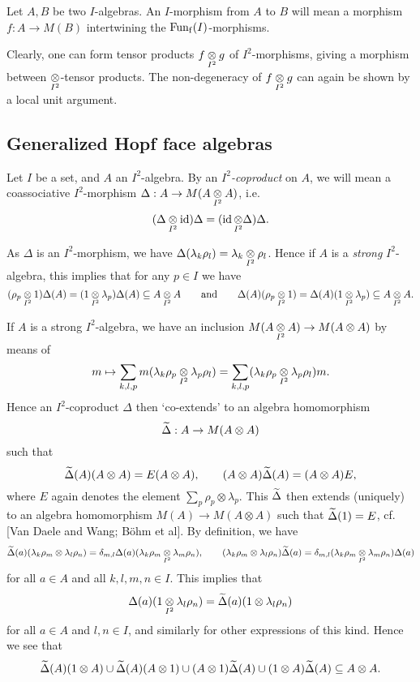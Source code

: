 \begin{Def} Let $A,B$ be two $I$-algebras. An $I$-morphism from $A$ to $B$ will mean a morphism $f:A\rightarrow M(B)$ intertwining the $\mathrm{Fun}_{\operatorname{\mathrm{f}}}(I)$-morphisms.
\end{Def}

Clearly, one can form tensor products $f\underset{I^2}{\otimes} g$ of $I^2$-morphisms,
giving a morphism between $\underset{I^2}{\otimes}$-tensor products. The
non-degeneracy of $f\underset{I^2}{\otimes} g$ can again be shown by a local unit
argument.

\subsection{Generalized Hopf face algebras}

\begin{Def} Let $I$ be a set, and $A$ an $I^2$-algebra. By an
  \emph{$I^2$-coproduct} on $A$, we will mean a coassociative
  $I^2$-morphism $\Delta:A\rightarrow M(A\underset{I^2}{\otimes} A)$,
  i.e. \[(\Delta\underset{I^2}{\otimes} \operatorname{id})\Delta = (\operatorname{id}\underset{I^2}{\otimes} \Delta)\Delta.\]
\end{Def}

\begin{Rem}\label{RemMult} As $\Delta$ is an $I^2$-morphism, we have
  $\Delta(\lambda_k\rho_l) =\lambda_k\underset{I^2}{\otimes} \rho_l$. Hence if $A$ is
  a \emph{strong} $I^2$-algebra, this implies that for any $p\in I$ we
  have \[(\rho_p\underset{I^2}{\otimes} 1)\Delta(A) = (1\underset{I^2}{\otimes} \lambda_p)\Delta(A)
  \subseteq A\underset{I^2}{\otimes} A \qquad \textrm{and}\qquad
  \Delta(A)(\rho_p\underset{I^2}{\otimes} 1)= \Delta(A)(1\underset{I^2}{\otimes} \lambda_p) \subseteq
  A\underset{I^2}{\otimes} A.\]
\end{Rem}

\begin{Rem} If $A$ is a strong $I^2$-algebra, we have an inclusion
  $M(A\underset{I^2}{\otimes} A)\rightarrow M(A\otimes A)$ by means of \[m\mapsto
  \sum_{k,l,p} m(\lambda_k\rho_p\underset{I^2}{\otimes} \lambda_p\rho_l) =
  \sum_{k,l,p} (\lambda_k\rho_p\underset{I^2}{\otimes} \lambda_p\rho_l)m.\] Hence an
  $I^2$-coproduct $\Delta$ then `co-extends' to an algebra
  homomorphism \[\widetilde{\Delta}: A\rightarrow M(A\otimes A)\] such
  that \[\widetilde{\Delta}(A)(A\otimes A) = E(A\otimes A),\qquad (A\otimes
  A)\widetilde{\Delta}(A) = (A\otimes A)E,\] where $E$ again denotes the element
  $\sum_{p}\rho_p\otimes \lambda_p$. This $\widetilde{\Delta}$ then extends
  (uniquely) to an algebra homomorphism $M(A)\rightarrow M(A\otimes
  A)$ such that $\widetilde{\Delta}(1) = E$, cf. [Van Daele and Wang; B\"{o}hm et
  al]. By definition, we have \[\widetilde{\Delta}(a)(\lambda_k\rho_m\otimes
  \lambda_l\rho_n) = \delta_{m,l}\Delta(a)(\lambda_k\rho_m\underset{I^2}{\otimes}
  \lambda_m\rho_n), \qquad (\lambda_k\rho_m\otimes \lambda_l\rho_n)
  \widetilde{\Delta}(a)= \delta_{m,l}(\lambda_k\rho_m\underset{I^2}{\otimes}
  \lambda_m\rho_n)\Delta(a)\] for all $a\in A$ and all $k,l,m,n\in
  I$. This implies that \[\Delta(a)(1\underset{I^2}{\otimes} \lambda_l\rho_n) =
  \widetilde{\Delta}(a)(1\otimes \lambda_l\rho_n)\] for all $a\in A$ and $l,n\in
  I$, and similarly for other expressions of this kind. Hence we see
  that \[\widetilde{\Delta}(A)(1\otimes A)\cup \widetilde{\Delta}(A)(A\otimes 1)\cup
  (A\otimes 1)\widetilde{\Delta}(A)\cup (1\otimes A)\widetilde{\Delta}(A)\subseteq A\otimes
  A.\]
\end{Rem}

